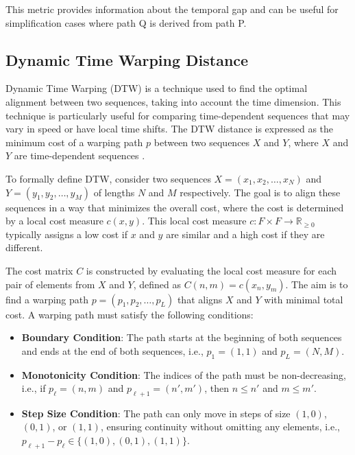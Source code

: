 This metric provides information about the temporal gap and can be useful for simplification cases where path Q is derived from path P.


\subsection{Dynamic Time Warping Distance}

Dynamic Time Warping (DTW) is a technique used to find the optimal alignment between two sequences, taking into account the time dimension. This technique is particularly useful for comparing time-dependent sequences that may vary in speed or have local time shifts. The DTW distance is expressed as the minimum cost of a warping path \( p \) between two sequences \( X \) and \( Y \), where \( X \) and \( Y \) are time-dependent sequences \cite{muller2007dynamic}.

To formally define DTW, consider two sequences \( X = (x_1, x_2, \ldots, x_N) \) and \( Y = (y_1, y_2, \ldots, y_M) \) of lengths \( N \) and \( M \) respectively. The goal is to align these sequences in a way that minimizes the overall cost, where the cost is determined by a local cost measure \( c(x, y) \). This local cost measure \( c: F \times F \rightarrow \mathbb{R}_{\geq 0} \) typically assigns a low cost if \( x \) and \( y \) are similar and a high cost if they are different.

The cost matrix \( C \) is constructed by evaluating the local cost measure for each pair of elements from \( X \) and \( Y \), defined as \( C(n, m) = c(x_n, y_m) \). The aim is to find a warping path \( p = (p_1, p_2, \ldots, p_L) \) that aligns \( X \) and \( Y \) with minimal total cost. A warping path must satisfy the following conditions:

\begin{itemize}
    \item \textbf{Boundary Condition}: The path starts at the beginning of both sequences and ends at the end of both sequences, i.e., \( p_1 = (1, 1) \) and \( p_L = (N, M) \).
    \item \textbf{Monotonicity Condition}: The indices of the path must be non-decreasing, i.e., if \( p_{\ell} = (n, m) \) and \( p_{\ell+1} = (n', m') \), then \( n \leq n' \) and \( m \leq m' \).
    \item \textbf{Step Size Condition}: The path can only move in steps of size \( (1, 0) \), \( (0, 1) \), or \( (1, 1) \), ensuring continuity without omitting any elements, i.e., \( p_{\ell+1} - p_{\ell} \in \{(1, 0), (0, 1), (1, 1)\} \).
\end{itemize}

